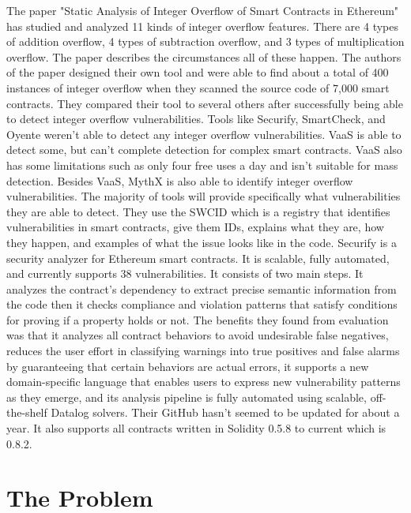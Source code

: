 \documentclass{article}
\begin{document}
The paper "Static Analysis of Integer Overflow of Smart Contracts in Ethereum" \cite{Static} has studied and analyzed 11 kinds of integer overflow features. There are 4 types of addition overflow, 4 types of subtraction overflow, and 3 types of multiplication overflow. The paper describes the circumstances all of these happen. The authors of the paper designed their own tool and were able to find about a total of 400 instances of integer overflow when they scanned the source code of 7,000 smart contracts. They compared their tool to several others after successfully being able to detect integer overflow vulnerabilities. Tools like Securify, SmartCheck, and Oyente weren't able to detect any integer overflow vulnerabilities. VaaS is able to detect some, but can't complete detection for complex smart contracts. VaaS also has some limitations such as only four free uses a day and isn't suitable for mass detection. Besides VaaS, MythX is also able to identify integer overflow vulnerabilities. The majority of tools will provide specifically what vulnerabilities they are able to detect. They use the SWCID \cite{SWCReg} which is a registry that identifies vulnerabilities in smart contracts, give them IDs, explains what they are, how they happen, and examples of what the issue looks like in the code. Securify \cite{Securify} is a security analyzer for Ethereum smart contracts. It is scalable, fully automated, and currently supports 38 vulnerabilities.  It consists of two main steps. It analyzes the contract's dependency to extract precise semantic information from the code then it checks compliance and violation patterns that satisfy conditions for proving if a property holds or not. The benefits they found from evaluation was that it analyzes all contract behaviors to avoid undesirable false negatives, reduces the user effort in classifying warnings into true positives and false alarms by guaranteeing that certain behaviors are actual errors, it supports a new domain-specific language that enables users to express new vulnerability patterns as they emerge, and its analysis pipeline is fully automated using scalable, off-the-shelf Datalog solvers. Their GitHub hasn't seemed to be updated for about a year. It also supports all contracts written in Solidity 0.5.8 to current which is 0.8.2.

\section{The Problem}
\end{document}
